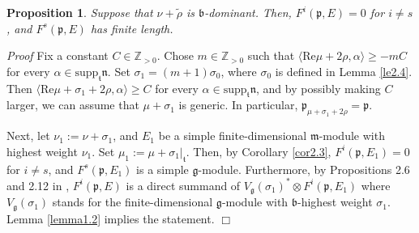 \documentclass[11pt]{amsart}
\newcounter{theorem}
\newtheorem{prop}[theo]{Proposition}
\renewenvironment{proof}{ \emph{Proof}}{$\Box$}
\renewcommand{\tt}{\mathfrak{t}}
\newcommand{\nn}{\mathfrak{n}}
\newcommand{\mm}{\mathfrak{m}}
\newcommand{\pp}{\mathfrak{p}}
\renewcommand{\gg}{\mathfrak{g}}
\newcommand{\bb}{\mathfrak{b}}
\newcommand{\refle}[1]{Lemma \ref{#1}}
\newcommand{\refcor}[1]{Corollary \ref{#1}}
\newcommand{\supp}{\mathrm{supp}}
\newcommand{\field}[1]{\mathbb{#1}}
\begin{document}
\begin{prop}\label{pr2.5}
Suppose that $\nu+\tilde{\rho}$ is $\bb$-dominant. Then, $F^i(\pp,E)=0$ for $i\neq s$, and $F^s(\pp,E)$ has finite length.
\end{prop}
\begin{proof}
Fix a constant $C\in\field{Z}_{>0}$. Chose $m\in\field{Z}_{>0}$ such that $\langle\mathrm{Re}\mu+2\rho,\alpha\rangle\geq-mC$ for every $\alpha\in\supp_\tt\nn$. Set $\sigma_1=(m+1)\sigma_0$, where $\sigma_0$ is defined in \refle{le2.4}. Then $\langle\mathrm{Re}\mu+\sigma_1+2\rho,\alpha\rangle\geq C$ for every $\alpha\in\supp_\tt\nn$, and by possibly making $C$ larger, we can assume that $\mu+\sigma_1$ is generic. In particular, $\pp_{\mu+\sigma_1+2\rho}=\pp$.

Next, let $\nu_1:=\nu+\sigma_1$, and $E_1$ be a simple finite-dimensional $\mm$-module with highest weight $\nu_1$. Set $\mu_1:=\mu+\sigma_1 |_\tt$. Then, by \refcor{cor2.3}, $F^i(\pp,E_1)=0$ for $i\neq s$, and $F^s(\pp,E_1)$ is a simple $\gg$-module. Furthermore, by Propositions 2.6 and 2.12 in \cite{Z}, $F^i(\pp,E)$ is a direct summand of $V_\gg(\sigma_1)^*\otimes F^i(\pp,E_1)$ where $V_\gg(\sigma_1)$ stands for the finite-dimensional $\gg$-module with $\bb$-highest weight $\sigma_1$. \refle{lemma1.2} implies the statement.
\end{proof}
\end{document}
